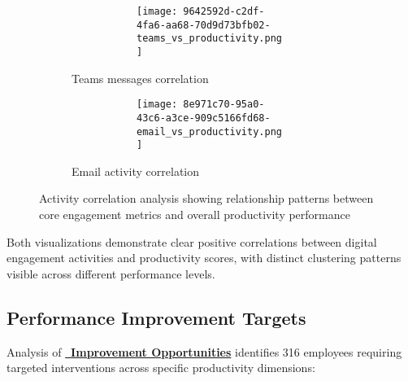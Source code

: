\documentclass[12pt,a4paper]{article}
\begin{document}
\begin{figure}[H]
\centering
\begin{subfigure}{0.48\textwidth}
\begin{figure}
        \centering
        \begin{figure}
            \centering
            \texttt{[image: 9642592d-c2df-4fa6-aa68-70d9d73bfb02-teams\_vs\_productivity.png]}
        \end{figure}
    \end{figure}
        \caption{Teams messages correlation}
    \label{fig:teams_productivity}
\end{subfigure}
\hfill
\begin{subfigure}{0.48\textwidth}
\begin{figure}
        \centering
        \begin{figure}
            \centering
            \texttt{[image: 8e971c70-95a0-43c6-a3ce-909c5166fd68-email\_vs\_productivity.png]}
        \end{figure}
    \end{figure}
        \caption{Email activity correlation}
    \label{fig:email_productivity}
\end{subfigure}
\caption{Activity correlation analysis showing relationship patterns between core engagement metrics and overall productivity performance}
\end{figure}

Both visualizations demonstrate clear positive correlations between digital engagement activities and productivity scores, with distinct clustering patterns visible across different performance levels.

\subsection{Performance Improvement Targets}

Analysis of \textcolor{successGreen}{\href{https://fixysaskihumorizijuv.supabase.co/storage/v1/object/public/research-files/03f82764-e85b-4f1f-b127-04cb7347bd2b-improvement_opportunities_detailed.csv?download=}{{\normalsize\faCheckCircle}\, \textbf{Improvement Opportunities}}} identifies 316 employees requiring targeted interventions across specific productivity dimensions:
\end{document}
